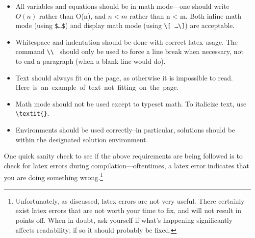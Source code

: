 \documentclass{article}
\begin{document}
\begin{itemize}
  \item All variables and equations should be in math mode---one should write $O(n)$ rather than O(n), and $n < m$ rather than n < m.  Both inline math mode (using \texttt{\$\ldots \$}) and display math mode (using \texttt{\textbackslash[ \ldots \textbackslash]}) are acceptable.
  \item Whitespace and indentation should be done with correct latex usage.  The command \texttt{\textbackslash\textbackslash} ~should only be used to force a line break when necessary, not to end a paragraph (when a blank line would do).
  \item Text should always fit on the page, as otherwise it is impossible to read.  \mbox{Here is an example of text not fitting on the page.}
  \item Math mode should not be used except to typeset math.  To italicize text, use \verb|\textit{}|.
  \item Environments should be used correctly--in particular, solutions should be within the designated solution environment.
\end{itemize}

One quick sanity check to see if the above requirements are being followed is to check for latex errors during compilation---oftentimes, a latex error indicates that you are doing something wrong.\footnote{Unfortunately, as discussed, latex errors are not very useful.  There certainly exist latex errors that are not worth your time to fix, and will not result in points off.  When in doubt, ask yourself if what's happening significantly affects readability; if so it should probably be fixed.}
\end{document}
